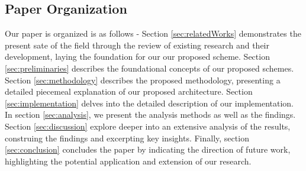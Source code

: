 \documentclass[a4paper]{cas-sc}
\begin{document}
\subsection{Paper Organization}
Our paper is organized is as follows - Section \ref{sec:relatedWorks} demonstrates the present sate of the field through the review of existing research and their development, laying the foundation for our our proposed scheme. Section \ref{sec:preliminaries} describes the foundational concepts of our proposed schemes. Section \ref{sec:methodology} describes the proposed methodology, presenting a detailed piecemeal explanation of our proposed architecture. Section \ref{sec:implementation} delves into the detailed description of our implementation. In section \ref{sec:analysis}, we present the analysis methods as well as the findings. Section \ref{sec:discussion} explore deeper into an extensive analysis of the results, construing the findings and excerpting key insights. Finally, section \ref{sec:conclusion} concludes the paper by indicating the direction of future work, highlighting the potential application and extension of our research.


\end{document}
